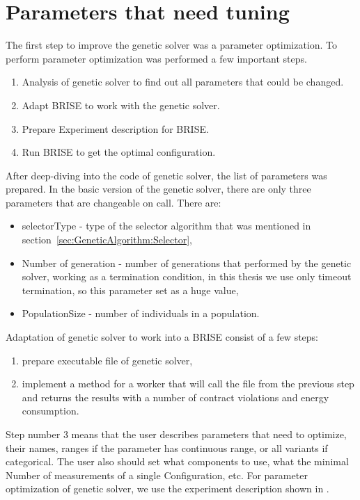 \section{Parameters that need tuning}
The first step to improve the genetic solver was a parameter optimization. To perform parameter optimization was performed a few important steps.
\begin{enumerate}
	\item Analysis of genetic solver to find out all parameters that could be changed. 
	\item Adapt BRISE to work with the genetic solver.
	\item Prepare Experiment description for BRISE.
	\item Run BRISE to get the optimal configuration.
\end{enumerate}

After deep-diving into the code of genetic solver, the list of parameters was prepared.
In the basic version of the genetic solver, there are only three parameters that are changeable on call. There are:
\begin{itemize}
	\item selectorType - type of the selector algorithm that was mentioned in section~\ref{sec:GeneticAlgorithm:Selector},
	\item Number of generation - number of generations that performed by the genetic solver, working as a termination condition, in this thesis we use only timeout termination, so this parameter set as a huge value,
	\item PopulationSize - number of individuals in a population.
\end{itemize}

Adaptation of genetic solver to work into a BRISE consist of a few steps:
\begin{enumerate}
	\item prepare executable file of genetic solver,
	\item implement a method for a worker that will call the file from the previous step and returns the results with a number of contract violations and energy consumption.
\end{enumerate}

Step number 3 means that the user describes parameters that need to optimize, their names, ranges if the parameter has continuous range, or all variants if categorical. The user also should set what components to use, what the minimal Number of measurements of a single Configuration, etc.
For parameter optimization of genetic solver, we use the experiment description shown in .

